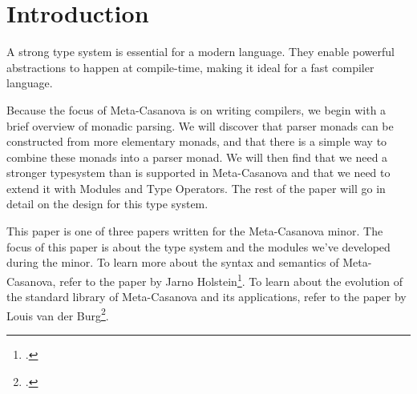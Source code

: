 \section{Introduction}
\begin{multicols*}{2}\noindent
A strong type system is essential for a modern language.
They enable powerful abstractions to happen at compile-time,
making it ideal for a fast compiler language.

Because the focus of Meta-Casanova is on writing compilers,
we begin with a brief overview of monadic parsing.
We will discover that parser monads can be constructed from more elementary monads,
and that there is a simple way to combine these monads into a parser monad.
We will then find that we need a stronger typesystem than is supported in Meta-Casanova
and that we need to extend it with Modules and Type Operators.
The rest of the paper will go in detail on the design for this type system.

This paper is one of three papers written for the Meta-Casanova minor.
The focus of this paper is about the type system and the modules we've developed during the minor.
To learn more about the syntax and semantics of Meta-Casanova, refer to the paper by Jarno Holstein\footcite{holstein16}.
To learn about the evolution of the standard library of Meta-Casanova and its applications, refer to the paper by Louis van der Burg\footcite{vanderburg16}.
\end{multicols*}

